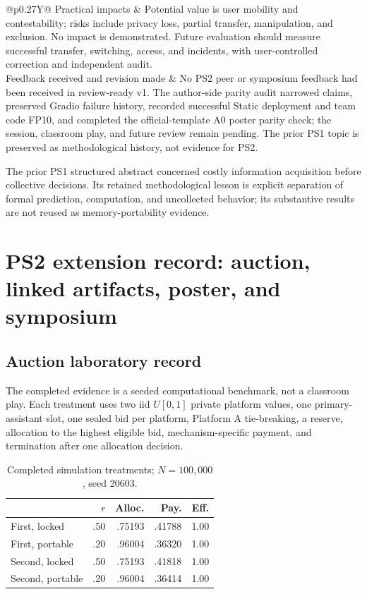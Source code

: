 \begin{table}[H]
\begin{tabularx}{\textwidth}{@{}p{}Y@{}}
Practical impacts & Potential value is user mobility and contestability; risks include privacy loss, partial transfer, manipulation, and exclusion. No impact is demonstrated. Future evaluation should measure successful transfer, switching, access, and incidents, with user-controlled correction and independent audit. \\
Feedback received and revision made & No PS2 peer or symposium feedback had been received in review-ready v1. The author-side parity audit narrowed claims, preserved Gradio failure history, recorded successful Static deployment and team code FP10, and completed the official-template A0 poster parity check; the session, classroom play, and future review remain pending. The prior PS1 topic is preserved as methodological history, not evidence for PS2. \\
\bottomrule
\end{tabularx}
\end{table}
\noindent The prior PS1 structured abstract concerned costly information acquisition before collective decisions. Its retained methodological lesson is explicit separation of formal prediction, computation, and uncollected behavior; its substantive results are not reused as memory-portability evidence.

\clearpage\twocolumn
\section{PS2 extension record: auction, linked artifacts, poster, and symposium}
\subsection{Auction laboratory record}
The completed evidence is a seeded computational benchmark, not a classroom play. Each treatment uses two iid $U[0,1]$ private platform values, one primary-assistant slot, one sealed bid per platform, Platform A tie-breaking, a reserve, allocation to the highest eligible bid, mechanism-specific payment, and termination after one allocation decision.

\begin{table}[h]
\caption{Completed simulation treatments; $N=100{,}000$, seed 20603.}
\begin{tabularx}{\columnwidth}{@{}p{1.15cm}rrrr@{}}\toprule
&\textbf{$r$}&\textbf{Alloc.}&\textbf{Pay.}&\textbf{Eff.}\\\midrule
First, locked&.50&.75193&.41788&1.00\\
First, portable&.20&.96004&.36320&1.00\\
Second, locked&.50&.75193&.41818&1.00\\
Second, portable&.20&.96004&.36414&1.00\\\bottomrule
\end{tabularx}
\end{table}

